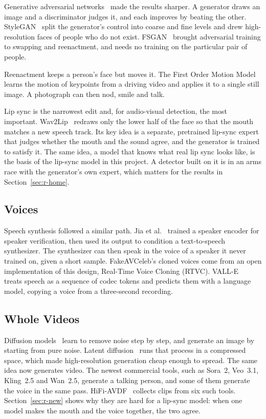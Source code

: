 Generative adversarial networks~\cite{gan} made the results sharper. A
generator draws an image and a discriminator judges it, and each improves by
beating the other. StyleGAN~\cite{stylegan} split the generator's control into
coarse and fine levels and drew high-resolution faces of people who do not
exist. FSGAN~\cite{fsgan} brought adversarial training to swapping and
reenactment, and needs no training on the particular pair of people.

Reenactment keeps a person's face but moves it. The First Order Motion
Model~\cite{fomm} learns the motion of keypoints from a driving video and
applies it to a single still image. A photograph can then nod, smile and talk.

Lip sync is the narrowest edit and, for audio-visual detection, the most
important. Wav2Lip~\cite{wav2lip} redraws only the lower half of the face so
that the mouth matches a new speech track. Its key idea is a separate,
pretrained lip-sync expert that judges whether the mouth and the sound agree,
and the generator is trained to satisfy it. The same idea, a model that knows
what real lip sync looks like, is the basis of the lip-sync model in this
project. A detector built on it is in an arms race with the generator's own
expert, which matters for the results in Section~\ref{sec:r-home}.

\subsection{Voices}

Speech synthesis followed a similar path. Jia et al.~\cite{sv2tts} trained a
speaker encoder for speaker verification, then used its output to condition a
text-to-speech synthesizer. The synthesizer can then speak in the voice of a
speaker it never trained on, given a short sample. FakeAVCeleb's cloned voices
come from an open implementation of this design, Real-Time Voice Cloning
(RTVC). VALL-E~\cite{valle} treats speech as a sequence of codec tokens and
predicts them with a language model, copying a voice from a three-second
recording.

\subsection{Whole Videos}

Diffusion models~\cite{ddpm} learn to remove noise step by step, and generate
an image by starting from pure noise. Latent diffusion~\cite{ldm} runs that
process in a compressed space, which made high-resolution generation cheap
enough to spread. The same idea now generates video. The newest commercial
tools, such as Sora~2, Veo~3.1, Kling~2.5 and Wan~2.5, generate a talking
person, and some of them generate the voice in the same pass. HiFi-AVDF~\cite{havic}
collects clips from six such tools. Section~\ref{sec:r-new} shows why they are
hard for a lip-sync model: when one model makes the mouth and the voice
together, the two agree.

